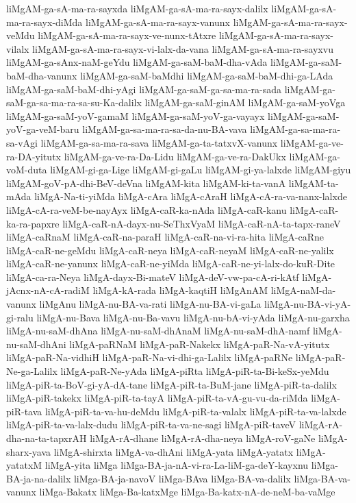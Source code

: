 {liMgAM-ga-sA-ma-ra-sayxda
liMgAM-ga-sA-ma-ra-sayx-dalilx
liMgAM-ga-sA-ma-ra-sayx-diMda
liMgAM-ga-sA-ma-ra-sayx-vanunx
liMgAM-ga-sA-ma-ra-sayx-veMdu
liMgAM-ga-sA-ma-ra-sayx-ve-nunx-tAtxre
liMgAM-ga-sA-ma-ra-sayx-vilalx
liMgAM-ga-sA-ma-ra-sayx-vi-lalx-da-vana
liMgAM-ga-sA-ma-ra-sayxvu
liMgAM-ga-sAnx-naM-geYdu
liMgAM-ga-saM-baM-dha-vAda
liMgAM-ga-saM-baM-dha-vanunx
liMgAM-ga-saM-baMdhi
liMgAM-ga-saM-baM-dhi-ga-LAda
liMgAM-ga-saM-baM-dhi-yAgi
liMgAM-ga-saM-ga-sa-ma-ra-sada
liMgAM-ga-saM-ga-sa-ma-ra-sa-su-Ka-dalilx
liMgAM-ga-saM-ginAM
liMgAM-ga-saM-yoVga
liMgAM-ga-saM-yoV-gamaM
liMgAM-ga-saM-yoV-ga-vayayx
liMgAM-ga-saM-yoV-ga-veM-baru
liMgAM-ga-sa-ma-ra-sa-da-nu-BA-vava
liMgAM-ga-sa-ma-ra-sa-vAgi
liMgAM-ga-sa-ma-ra-sava
liMgAM-ga-ta-tatxvX-vanunx
liMgAM-ga-ve-ra-DA-yitutx
liMgAM-ga-ve-ra-Da-Lidu
liMgAM-ga-ve-ra-DakUkx
liMgAM-ga-voM-duta
liMgAM-gi-ga-Lige
liMgAM-gi-gaLu
liMgAM-gi-ya-lalxde
liMgAM-giyu
liMgAM-goV-pA-dhi-BeV-deVna
liMgAM-kita
liMgAM-ki-ta-vanA
liMgAM-ta-mAda
liMgA-Na-ti-yiMda
liMgA-cAra
liMgA-cAraH
liMgA-cA-ra-va-nanx-lalxde
liMgA-cA-ra-veM-be-nayAyx
liMgA-caR-ka-nAda
liMgA-caR-kanu
liMgA-caR-ka-ra-papxre
liMgA-caR-nA-dayx-nu-SeThxVyaM
liMgA-caR-nA-ta-tapx-raneV
liMgA-caRnaM
liMgA-caR-na-paraH
liMgA-caR-na-vi-ra-hita
liMgA-caRne
liMgA-caR-ne-geMdu
liMgA-caR-neya
liMgA-caR-neyaM
liMgA-caR-ne-yalilx
liMgA-caR-ne-yanunx
liMgA-caR-ne-yiMda
liMgA-caR-ne-yi-lalx-do-kuR-Dite
liMgA-ca-ra-Neya
liMgA-dayx-Bi-mateV
liMgA-deV-vw-pa-cA-ri-kAtf
liMgA-jAcnx-nA-cA-radiM
liMgA-kA-rada
liMgA-kaqtiH
liMgAnAM
liMgA-naM-da-vanunx
liMgAnu
liMgA-nu-BA-va-rati
liMgA-nu-BA-vi-gaLa
liMgA-nu-BA-vi-yA-gi-ralu
liMgA-nu-Bava
liMgA-nu-Ba-vavu
liMgA-nu-bA-vi-yAda
liMgA-nu-garxha
liMgA-nu-saM-dhAna
liMgA-nu-saM-dhAnaM
liMgA-nu-saM-dhA-namf
liMgA-nu-saM-dhAni
liMgA-paRNaM
liMgA-paR-Nakekx
liMgA-paR-Na-vA-yitutx
liMgA-paR-Na-vidhiH
liMgA-paR-Na-vi-dhi-ga-Lalilx
liMgA-paRNe
liMgA-paR-Ne-ga-Lalilx
liMgA-paR-Ne-yAda
liMgA-piRta
liMgA-piR-ta-Bi-keSx-yeMdu
liMgA-piR-ta-BoV-gi-yA-dA-tane
liMgA-piR-ta-BuM-jane
liMgA-piR-ta-dalilx
liMgA-piR-takekx
liMgA-piR-ta-tayA
liMgA-piR-ta-vA-gu-vu-da-riMda
liMgA-piR-tava
liMgA-piR-ta-va-hu-deMdu
liMgA-piR-ta-valalx
liMgA-piR-ta-va-lalxde
liMgA-piR-ta-va-lalx-dudu
liMgA-piR-ta-va-ne-sagi
liMgA-piR-taveV
liMgA-rA-dha-na-ta-tapxrAH
liMgA-rA-dhane
liMgA-rA-dha-neya
liMgA-roV-gaNe
liMgA-sharx-yava
liMgA-shirxta
liMgA-va-dhAni
liMgA-yata
liMgA-yatatx
liMgA-yatatxM
liMgA-yita
liMga
liMga-BA-ja-nA-vi-ra-La-liM-ga-deY-kayxnu
liMga-BA-ja-na-dalilx
liMga-BA-ja-navoV
liMga-BAva
liMga-BA-va-dalilx
liMga-BA-va-vanunx
liMga-Bakatx
liMga-Ba-katxMge
liMga-Ba-katx-nA-de-neM-ba-vaMge
}
